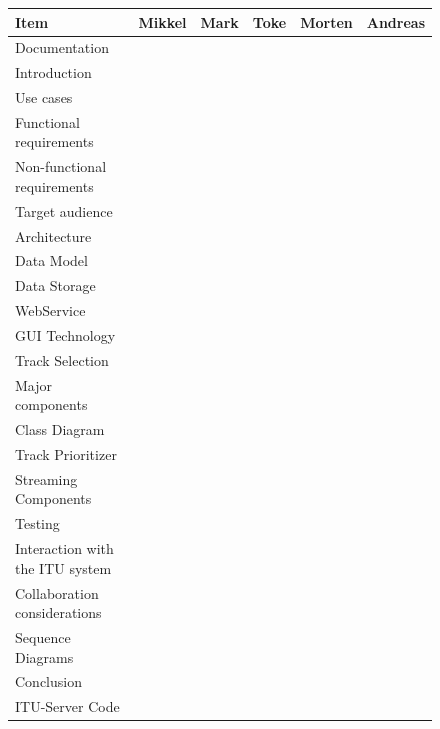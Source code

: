 \documentclass[a4paper,11pt,report]{article}
\begin{document}
\begin{figure}[htp]
\begin{tabular}{| l | l | l | l | l | l |}
  \hline
  Item & Mikkel & Mark & Toke & Morten & Andreas \\
  \hline
  \multicolumn{6}{|l|}{Documentation} \\
  \hline
  Introduction &  &\cellcolor{Gray} &\cellcolor{Gray}&  & \\
  \hline
  Use cases & \cellcolor{Gray} & \cellcolor{Gray} & \cellcolor{Gray} & \cellcolor{Gray} & \cellcolor{Gray} \\
  \hline
  Functional requirements & \cellcolor{Gray} & \cellcolor{Gray} & \cellcolor{Gray} & \cellcolor{Gray} & \cellcolor{Gray} \\
  \hline
  Non-functional requirements & \cellcolor{Gray} &\cellcolor{Gray}  &  &  &  \\
  \hline
  Target audience &  &  &  &  & \cellcolor{Gray} \\
  \hline
  Architecture &  & \cellcolor{Gray} &  &  &  \\
  \hline
  Data Model & & \cellcolor{Gray} & \cellcolor{Gray} &  &  \\
  \hline
  Data Storage &  &  &  &  & \cellcolor{Gray} \\
  \hline
  WebService & \cellcolor{Gray} &  &  &  &  \\
  \hline
  GUI Technology &  &  & \cellcolor{Gray} &  &  \\
  \hline
  Track Selection &  & \cellcolor{Gray} &  &  &  \\
  \hline
  Major components &  & \cellcolor{Gray} &  & \cellcolor{Gray} &  \\
  \hline
  Class Diagram &  &  &  & \cellcolor{Gray} &  \\
  \hline
  Track Prioritizer &  & \cellcolor{Gray} &  &  &  \\
  \hline
  Streaming Components &  & \cellcolor{Gray} &  &  &  \\
  \hline
  Testing &  & \cellcolor{Gray} &  & \cellcolor{Gray} &  \\
  \hline
  Interaction with the ITU system &  & \cellcolor{Gray} &  &  &  \\
  \hline
  Collaboration considerations &  &  & \cellcolor{Gray} &  &  \\
  \hline
  Sequence Diagrams &  & \cellcolor{Gray} &  &  &  \\
  \hline
  Conclusion &  &  &  &  &  \\
  \hline
  \multicolumn{6}{|l|}{ITU-Server Code} \\

\end{tabular}
\end{figure}
\end{document}
